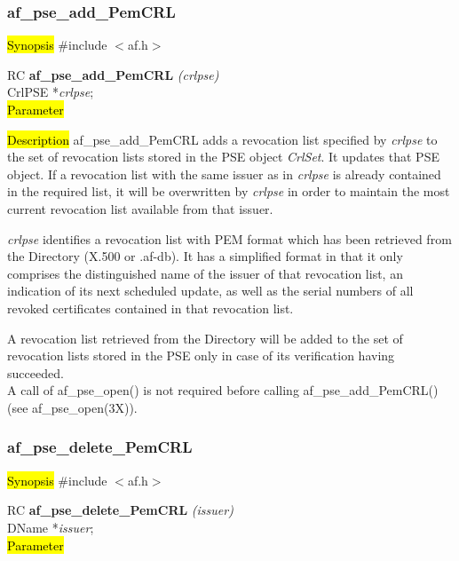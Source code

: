 \subsubsection{af\_pse\_add\_PemCRL}
\label{af_add_PemCRL}
\hl{Synopsis}
\#include $<$af.h$>$ 

RC {\bf af\_pse\_add\_PemCRL} {\em (crlpse)} \\
CrlPSE *{\em crlpse}; \\
\hl{Parameter}

\hl{Description}
af\_pse\_add\_PemCRL adds a revocation list specified by {\em crlpse} to the set
of revocation lists stored in the PSE object {\em CrlSet}. It updates that PSE object. 
If a revocation list with the same issuer as in {\em crlpse} is already contained 
in the required list, it will be overwritten by {\em crlpse} in order to maintain
the most current revocation list available from that issuer.

{\em crlpse} identifies a revocation list with PEM format which has been retrieved from
the Directory (X.500 or .af-db). It has a simplified format in that it only comprises the distinguished
name of the issuer of that revocation list, an indication of its next scheduled update,
as well as the serial numbers of all revoked certificates contained in that revocation list.
 
A revocation list retrieved from the Directory will be added to the set of revocation lists
stored in the PSE only in case of its verification having succeeded. 
\\ [1em]
A call of af\_pse\_open() is not required before calling af\_pse\_add\_PemCRL()
(see af\_pse\_open(3X)).


\subsubsection{af\_pse\_delete\_PemCRL}
\label{af_delete_PemCRL}
\hl{Synopsis}
\#include $<$af.h$>$ 

RC {\bf af\_pse\_delete\_PemCRL} {\em (issuer)} \\
DName *{\em issuer}; \\
\hl{Parameter}

